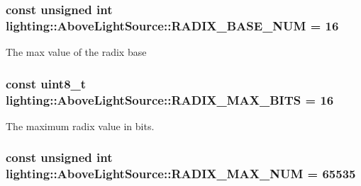 \subsubsection[{\texorpdfstring{R\+A\+D\+I\+X\+\_\+\+B\+A\+S\+E\+\_\+\+N\+UM}{RADIX_BASE_NUM}}]{\setlength{\rightskip}{0pt plus 5cm}const unsigned int lighting\+::\+Above\+Light\+Source\+::\+R\+A\+D\+I\+X\+\_\+\+B\+A\+S\+E\+\_\+\+N\+UM = 16\hspace{0.3cm}{\ttfamily [static]}}\hypertarget{classlighting_1_1AboveLightSource_aa27d69b85b99509a937f3b6cf34e6f5b}{}\label{classlighting_1_1AboveLightSource_aa27d69b85b99509a937f3b6cf34e6f5b}


The max value of the radix base 

\subsubsection[{\texorpdfstring{R\+A\+D\+I\+X\+\_\+\+M\+A\+X\+\_\+\+B\+I\+TS}{RADIX_MAX_BITS}}]{\setlength{\rightskip}{0pt plus 5cm}const uint8\+\_\+t lighting\+::\+Above\+Light\+Source\+::\+R\+A\+D\+I\+X\+\_\+\+M\+A\+X\+\_\+\+B\+I\+TS = 16\hspace{0.3cm}{\ttfamily [static]}}\hypertarget{classlighting_1_1AboveLightSource_a4154fa07c5a68055db8c6a710cf0dbec}{}\label{classlighting_1_1AboveLightSource_a4154fa07c5a68055db8c6a710cf0dbec}


The maximum radix value in bits. 

\subsubsection[{\texorpdfstring{R\+A\+D\+I\+X\+\_\+\+M\+A\+X\+\_\+\+N\+UM}{RADIX_MAX_NUM}}]{\setlength{\rightskip}{0pt plus 5cm}const unsigned int lighting\+::\+Above\+Light\+Source\+::\+R\+A\+D\+I\+X\+\_\+\+M\+A\+X\+\_\+\+N\+UM = 65535\hspace{0.3cm}{\ttfamily [static]}}\hypertarget{classlighting_1_1AboveLightSource_afb7f4c5e212f5fcc97bcf06a16b21ac3}{}\label{classlighting_1_1AboveLightSource_afb7f4c5e212f5fcc97bcf06a16b21ac3}



